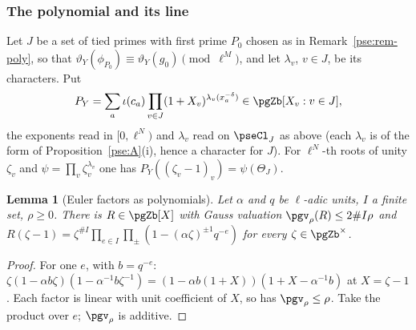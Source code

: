 \documentclass[10pt]{amsart}
\newtheorem{lemma}[theorem]{Lemma}
\theoremstyle{definition}
\theoremstyle{remark}
\begin{document}
\subsubsection*{The polynomial and its line}
Let $J$ be a set of tied primes with first prime $P_0$ chosen as in Remark~\ref{pse:rem-poly}, so
that $\vartheta_Y(\phi_{P_0})\equiv\vartheta_Y(g_0)\pmod{\ell^M}$, and let $\lambda_v$, $v\in J$, be
its characters. Put
\[
P_Y=\sum_a\iota(c_a)\prod_{v\in J}(1+X_v)^{\lambda_v(x_a^{-\delta})}\in\pgZb[X_v:v\in J],
\]
the exponents read in $[0,\ell^N)$ and $\lambda_v$ read on $\pseCl_J$ as above (each $\lambda_v$ is
of the form of Proposition~\ref{pse:A}(i), hence a character for $J$). For $\ell^N$-th roots of unity
$\zeta_v$ and $\psi=\prod_v\zeta_v^{\lambda_v}$ one has $P_Y((\zeta_v-1)_v)=\psi(\Theta_J)$.

\begin{lemma}[Euler factors as polynomials]\label{pse:eulerpoly}
Let $\alpha$ and $q$ be $\ell$-adic units, $I$ a finite set, $\rho\ge0$. There is $R\in\pgZb[X]$
with Gauss valuation $\pgv_\rho(R)\le2\#I\rho$ and $R(\zeta-1)=\zeta^{\#I}\prod_{e\in I}\prod_\pm
(1-(\alpha\zeta)^{\pm1}q^{-e})$ for every $\zeta\in\pgZb^\times$.
\end{lemma}
\begin{proof}
For one $e$, with $b=q^{-e}$: $\zeta(1-\alpha b\zeta)(1-\alpha^{-1}b\zeta^{-1})=(1-\alpha b(1+X))
(1+X-\alpha^{-1}b)$ at $X=\zeta-1$. Each factor is linear with unit coefficient of $X$, so has
$\pgv_\rho\le\rho$. Take the product over $e$; $\pgv_\rho$ is additive.
\end{proof}
\end{document}
